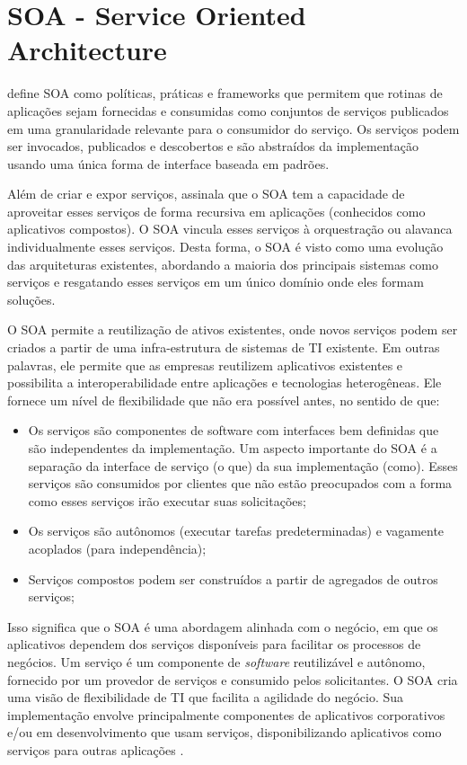 \section{SOA - Service Oriented Architecture}\label{sec:soa}

 define SOA como políticas, práticas e frameworks que permitem que rotinas de aplicações sejam fornecidas e consumidas como conjuntos de serviços publicados em uma granularidade relevante para o consumidor do serviço. Os serviços podem ser invocados, publicados e descobertos e são abstraídos da implementação usando uma única forma de interface baseada em padrões.

Além de criar e expor serviços,  assinala que o SOA tem a capacidade de aproveitar esses serviços de forma recursiva em aplicações (conhecidos como aplicativos compostos). O SOA vincula esses serviços à orquestração ou alavanca individualmente esses serviços. Desta forma, o SOA é visto como uma evolução das arquiteturas existentes, abordando a maioria dos principais sistemas como serviços e resgatando esses serviços em um único domínio onde eles formam soluções.

 O SOA permite a reutilização de ativos existentes, onde novos serviços podem ser criados a partir de uma infra-estrutura de sistemas de TI existente. Em outras palavras, ele permite que as empresas reutilizem aplicativos existentes e possibilita a interoperabilidade entre aplicações e tecnologias heterogêneas. Ele fornece um nível de flexibilidade que não era possível antes, no sentido de que:

\begin{itemize}
    \item Os serviços são componentes de software com interfaces bem definidas que são independentes da implementação. Um aspecto importante do SOA é a separação da interface de serviço (o que) da sua implementação (como). Esses serviços são consumidos por clientes que não estão preocupados com a forma como esses serviços irão executar suas solicitações;
    \item Os serviços são autônomos (executar tarefas predeterminadas) e vagamente acoplados (para independência);
    \item Serviços compostos podem ser construídos a partir de agregados de outros serviços;
\end{itemize}

Isso significa que o SOA é uma abordagem alinhada com o negócio, em que os aplicativos dependem dos serviços disponíveis para facilitar os processos de negócios. Um serviço é um componente de \textit{software} reutilizável e autônomo, fornecido por um provedor de serviços e consumido pelos solicitantes. O SOA cria uma visão de flexibilidade de TI que facilita a agilidade do negócio. Sua implementação envolve principalmente componentes de aplicativos corporativos e/ou em desenvolvimento que usam serviços, disponibilizando aplicativos como serviços para outras aplicações \cite{soa-book}.

